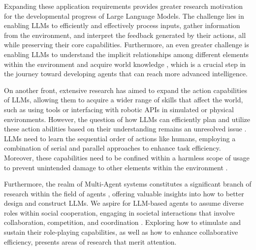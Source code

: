 Expanding these application requirements provides greater research motivation for the developmental progress of Large Language Models. 
The challenge lies in enabling LLMs to efficiently and effectively process inputs, gather information from the environment, and interpret the feedback generated by their actions, all while preserving their core capabilities. Furthermore, an even greater challenge is enabling LLMs to understand the implicit relationships among different elements within the environment and acquire world knowledge \cite{DBLP:journals/corr/abs-2308-01399,DBLP:conf/iclr/0002HBVPW23}, which is a crucial step in the journey toward developing agents that can reach more advanced intelligence. 

On another front, extensive research has aimed to expand the action capabilities of LLMs, allowing them to acquire a wider range of skills that affect the world, such as using tools or interfacing with robotic APIs in simulated or physical environments. However, the question of how LLMs can efficiently plan and utilize these action abilities based on their understanding remains an unresolved issue \cite{DBLP:journals/corr/abs-2304-08354}.
LLMs need to learn the sequential order of actions like humans, employing a combination of serial and parallel approaches to enhance task efficiency. Moreover, these capabilities need to be confined within a harmless scope of usage to prevent unintended damage to other elements within the environment \cite{DBLP:journals/corr/abs-2305-16960,DBLP:journals/corr/abs-2212-08073,DBLP:journals/corr/abs-2204-05862}.

Furthermore, the realm of Multi-Agent systems constitutes a significant branch of research within the field of agents \cite{DBLP:journals/corr/abs-2304-03442, DBLP:journals/corr/abs-2303-17760, DBLP:journals/corr/abs-2306-03314, DBLP:journals/corr/abs-2308-10848}, offering valuable insights into how to better design and construct LLMs. We aspire for LLM-based agents to assume diverse roles within social cooperation, engaging in societal interactions that involve collaboration, competition, and coordination \cite{DBLP:journals/corr/abs-2307-07924, DBLP:journals/corr/abs-2305-19118, DBLP:journals/corr/abs-2305-10142, DBLP:journals/corr/abs-2308-00352,DBLP:journals/corr/abs-2308-08155}. Exploring how to stimulate and sustain their role-playing capabilities, as well as how to enhance collaborative efficiency, presents areas of research that merit attention.




